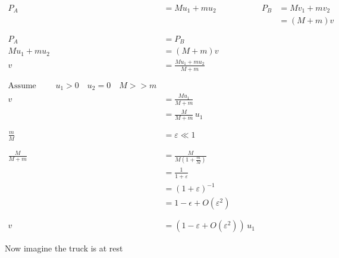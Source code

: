 \documentclass[12pt]{article}
\begin{document}
\begin{align*}
	P_A             & = M u_1 + m u_2                               & P_B & = M v_1 + m v_2 \\
	                &                                               &     & = (M + m) v     \\
	\phantom{=}                                                                             \\
	P_A             & = P_B                                                                 \\
	M u_1 + m u_2   & = (M + m) v                                                           \\
	v               & = \frac{M u_1 + m u_2}{M + m}                                         \\
	\phantom{=}                                                                             \\
	\text{Assume } \qquad u_1 > 0 \quad u_2 = 0 \quad M >> m                                \\
	v               & = \frac{M u_1}{M + m}                                                 \\
	                & = \frac{M}{M + m} \, u_1                                              \\
	\phantom{=}                                                                             \\
	\frac{m}{M}     & = \varepsilon \ll 1                                                   \\
	\phantom{=}                                                                             \\
	\frac{M}{M + m} & = \frac{M}{M(1 + \frac{m}{M})}                                        \\
	                & = \frac{1}{1 + \varepsilon}                                           \\
	                & = (1 + \varepsilon)^{-1}                                              \\
	                & = 1 - \epsilon + O(\varepsilon^2)                                     \\
	\phantom{=}                                                                             \\
	v               & = (1 - \varepsilon + O(\varepsilon^2)) \, u_1
\end{align*}

Now imagine the truck is at rest
\end{document}
